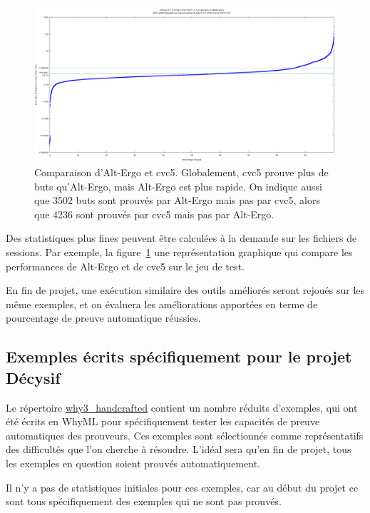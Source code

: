 \documentclass[a4paper,11pt]{article}
\begin{document}
\begin{figure}
  \centering
  \hspace*{-0.1\textwidth}\includegraphics[width=1.2\textwidth]{AE-vs-CVC5.png}
  \caption{Comparaison d'Alt-Ergo et cvc5. Globalement, cvc5 prouve
    plus de buts qu'Alt-Ergo, mais Alt-Ergo est plus rapide. On
    indique aussi que 3502 buts sont prouvés par Alt-Ergo mais pas par
    cvc5, alors que 4236 sont prouvés par cvc5 mais pas par Alt-Ergo.}
  \label{fig:AEvsCVC5}
  \hrulefill
\end{figure}

Des statistiques plus fines peuvent être calculées à la demande sur
les fichiers de sessions. Par exemple, la figure~\ref{fig:AEvsCVC5}
une représentation graphique qui compare les performances de Alt-Ergo
et de cvc5 sur le jeu de test.

En fin de projet, une exécution similaire des outils améliorés seront
rejoués sur les même exemples, et on évaluera les améliorations
apportées en terme de pourcentage de preuve automatique réussies.

\subsection{Exemples écrits spécifiquement pour le projet Décysif}

Le répertoire \url{why3_handcrafted} contient un nombre réduits
d'exemples, qui ont été écrits en WhyML pour spécifiquement tester les
capacités de preuve automatiques des prouveurs. Ces exemples sont
sélectionnés comme représentatifs des difficultés que l'on cherche à
résoudre. L'idéal sera qu'en fin de projet, tous les exemples en
question soient prouvés automatiquement.

Il n'y a pas de statistiques initiales pour ces exemples, car au début
du projet ce sont tous spécifiquement des exemples qui ne sont pas
prouvés.
\end{document}
